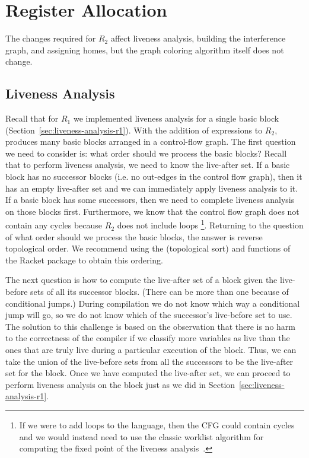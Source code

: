 \documentclass[11pt]{book}
\begin{document}
\section{Register Allocation}
\label{sec:register-allocation-r2}

The changes required for $R_2$ affect liveness analysis, building the
interference graph, and assigning homes, but the graph coloring
algorithm itself does not change.

\subsection{Liveness Analysis}
\label{sec:liveness-analysis-r2}

Recall that for $R_1$ we implemented liveness analysis for a single
basic block (Section~\ref{sec:liveness-analysis-r1}). With the
addition of  expressions to $R_2$, 
produces many basic blocks arranged in a control-flow graph. The first
question we need to consider is: what order should we process the
basic blocks? Recall that to perform liveness analysis, we need to
know the live-after set. If a basic block has no successor blocks
(i.e. no out-edges in the control flow graph), then it has an empty
live-after set and we can immediately apply liveness analysis to
it. If a basic block has some successors, then we need to complete
liveness analysis on those blocks first.  Furthermore, we know that
the control flow graph does not contain any cycles because $R_2$ does
not include loops
%
\footnote{If we were to add loops to the language, then the CFG could
  contain cycles and we would instead need to use the classic worklist
  algorithm for computing the fixed point of the liveness
  analysis~\citep{Aho:1986qf}.}.
%
Returning to the question of what order should we process the basic
blocks, the answer is reverse topological order. We recommend using
the  (topological sort) and  functions of
the Racket  package to obtain this ordering.

The next question is how to compute the live-after set of a block
given the live-before sets of all its successor blocks.  (There can be
more than one because of conditional jumps.)  During compilation we do
not know which way a conditional jump will go, so we do not know which
of the successor's live-before set to use.  The solution to this
challenge is based on the observation that there is no harm to the
correctness of the compiler if we classify more variables as live than
the ones that are truly live during a particular execution of the
block. Thus, we can take the union of the live-before sets from all
the successors to be the live-after set for the block. Once we have
computed the live-after set, we can proceed to perform liveness
analysis on the block just as we did in
Section~\ref{sec:liveness-analysis-r1}.
\end{document}
